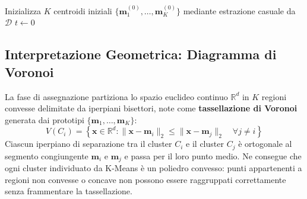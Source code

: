 \begin{algorithm}[htbp]
\SetAlgoLined
{}
Inizializza $K$ centroidi iniziali $\{\mathbf{m}_1^{(0)}, \dots, \mathbf{m}_K^{(0)}\}$ mediante estrazione casuale da $\mathcal{D}$\;
$t \leftarrow 0$\;
\caption{Algoritmo standard di K-Means (Lloyd).}
\label{alg:dm-kmeans-lloyd}
\end{algorithm}

\FloatBarrier
\subsection{Interpretazione Geometrica: Diagramma di Voronoi}

La fase di assegnazione partiziona lo spazio euclideo continuo $\mathbb{R}^d$ in $K$ regioni convesse delimitate da iperpiani bisettori, note come \textbf{tassellazione di Voronoi} generata dai prototipi $\{\mathbf{m}_1, \dots, \mathbf{m}_K\}$:
\begin{equation}
    V(C_i) = \left\{ \mathbf{x} \in \mathbb{R}^d : \|\mathbf{x} - \mathbf{m}_i\|_2 \le \|\mathbf{x} - \mathbf{m}_j\|_2 \quad \forall j \ne i \right\}
\end{equation}
Ciascun iperpiano di separazione tra il cluster $C_i$ e il cluster $C_j$ è ortogonale al segmento congiungente $\mathbf{m}_i$ e $\mathbf{m}_j$ e passa per il loro punto medio. Ne consegue che ogni cluster individuato da K-Means è un poliedro convesso: punti appartenenti a regioni non convesse o concave non possono essere raggruppati correttamente senza frammentare la tassellazione.

